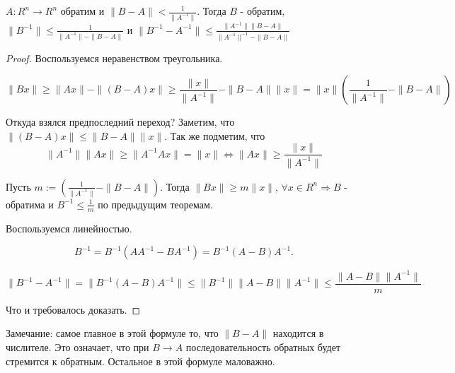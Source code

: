 \begin{theorem} \thmslashn
	
	$A: R^n \rightarrow R^n$ обратим и $\|B - A\| < \frac{1}{\|A^{-1}\|}$. Тогда $B$ - обратим, $\|B^{-1}\| \leq \frac{1}{\|A^{-1}\| - \|B - A\|}$ и $\|B^{-1} - A^{-1}\| \leq \frac{\|A^{-1}\| \|B - A\|}{\|A^{-1}\|^{-1} - \|B - A\| }$
	\begin{proof} \thmslashn
		
		 Воспользуемся неравенством треугольника.
		
		$$
		\|Bx\|
		\geq
		\|Ax\| - \|(B - A)x\|
		\geq
		\frac{\|x\|}{\|A^{-1}\|} - \|B - A\|\|x\|
		=
		\|x\|(\frac{1}{\|A^{-1}\|} - \|B - A\|)
		$$
		
		Откуда взялся предпоследний переход? Заметим, что $\|(B - A)x\| \leq \|B  - A\| \|x\|$. Так же подметим, что 
		$$
		\|A^{-1}\| \|Ax\| \geq \|A^{-1}Ax\|
		=
		\|x\| 
		\iff
		\|Ax\|
		\geq 
		\frac{\|x\|}{\|A^{-1}\|}$$
		
		Пусть $m:= (\frac{1}{\|A^{-1}\|} - \|B - A\|)$. Тогда $ \|Bx\| \geq m\|x\|$, $\forall x \in R^n \Rightarrow B$ - обратима и $B^{-1} \leq \frac{1}{m}$ по предыдущим теоремам. 
		
		Воспользуемся линейностью.
		
		$$
		B^{-1} 
		=
		B^{-1}(AA^{-1} - BA^{-1})
		=
		B^{-1}(A - B)A^{-1}.
		$$
		
		$$
		\|B^{-1} - A^{-1}\| 
		=
		\|B^{-1}(A-B)A^{-1}\|
		\leq
		\|B^{-1}\|\|A - B\|\|A^{-1}\|
		\leq
		\frac{\|A - B\|\|A^{-1}\|}{m}
		$$
		
		Что и требовалось доказать.
	\end{proof}
\end{theorem}

\begin{remark} \thmslashn
	
	Замечание: самое главное в этой формуле то, что $\|B - A\|$ находится в числителе. Это означает, что при $B \rightarrow A$ последовательность обратных будет стремится к обратным. Остальное в этой формуле маловажно.
\end{remark}
